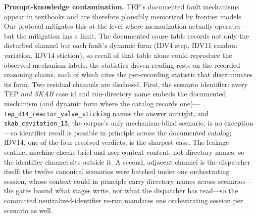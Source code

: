 \documentclass[preprint,10pt]{elsarticle}
\begin{document}
\textbf{Prompt-knowledge contamination.} TEP's documented fault mechanisms appear in textbooks and are therefore plausibly memorized by frontier models. Our protocol mitigates this at the level where memorization actually operates---but the mitigation has a limit. The documented cause table records not only the disturbed channel but each fault's dynamic form (IDV4 step, IDV11 random variation, IDV14 stiction), so recall of that table alone could reproduce the observed mechanism labels; the statistics-driven reading rests on the recorded reasoning chains, each of which cites the per-recording statistic that discriminates its form. Two residual channels are disclosed. First, the scenario identifier: every TEP \emph{and SKAB} case id and run-directory name embeds the documented mechanism (and dynamic form where the catalog records one)---\texttt{tep\_d14\_reactor\_valve\_sticking} names the answer outright, and \texttt{skab\_cavitation\_13}, the corpus's only mechanism-blind scenario, is no exception---so identifier recall is possible in principle across the documented catalog; IDV14, one of the four resolved verdicts, is the sharpest case. The leakage sentinel machine-checks brief and user-context content, not directory names, so the identifier channel sits outside it. A second, adjacent channel is the dispatcher itself: the twelve canonical scenarios were batched under one orchestrating session, whose context could in principle carry directory names across scenarios---the gates bound what stages write, not what the dispatcher has read---so the committed neutralized-identifier re-run mandates one orchestrating session per scenario as well.
\end{document}
